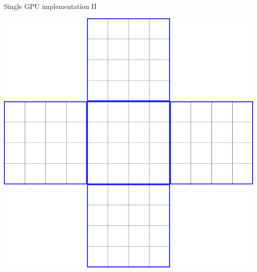 \documentclass{beamer}
\begin{document}
\begin{frame}{Single GPU implementation II}
\begin{itemize}
\begin{minipage}{0.3\textwidth}
            \includegraphics[keepaspectratio, width=\textwidth]{images/neighbour_metaspins.png}
        \end{minipage}
\end{itemize}
\end{frame}
\end{document}
